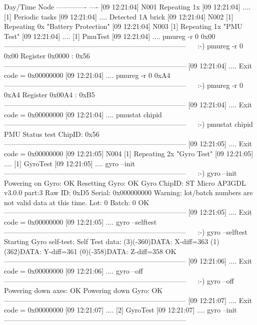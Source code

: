 \documentclass[11pt]{article}
\renewcommand{\mp}[1]{%
		\makebox[0in][r]{%
			\color{SmokeyDarkBlue}%
			\raisebox{0in}[0in][0in]{%
				\fbox{%
					\normalfont\bfseries\scriptsize##1%
					}%
				}%
			\rule[0.5ex]{2em}{\fboxrule}%
			\hspace{3pt}%
			}%
		}%
\begin{document}
\begin{AnnotedLogFile}
Day/Time      Node
------------- ----
[09 12:21:04] N001 Repeating 1x
[09 12:21:04] .... 	[1] Periodic tasks
[09 12:21:04] .... 		Detected 1A brick
[09 12:21:04] N002 	[1] Repeating 0x "Battery Protection"
[09 12:21:04] N003 	[1] Repeating 1x "PMU Test"
[09 12:21:04] .... 		[1] PmuTest
[09 12:21:04] .... 			pmureg -r 0 0x00
------------------------------------------------------------------------------
~\mp{Diags Command}~:-) pmureg -r 0 0x00
Register 0x0000 : 0x56
------------------------------------------------------------------------------
[09 12:21:04] .... 			Exit code = 0x00000000
[09 12:21:04] .... 			pmureg -r 0 0xA4
------------------------------------------------------------------------------
~\mp{Diags Command}~:-) pmureg -r 0 0xA4
Register 0x00A4 : 0xB5
------------------------------------------------------------------------------
[09 12:21:04] .... 			Exit code = 0x00000000
[09 12:21:04] .... 			pmustat chipid
------------------------------------------------------------------------------
~\mp{Diags Command}~:-) pmustat chipid
PMU Status test
ChipID: 0x56
------------------------------------------------------------------------------
[09 12:21:05] .... 			Exit code = 0x00000000
[09 12:21:05] N004 	[1] Repeating 2x "Gyro Test"
[09 12:21:05] .... 		[1] GyroTest
[09 12:21:05] .... 			gyro --init
------------------------------------------------------------------------------
~\mp{Diags Command}~:-) gyro --init
Powering on Gyro: OK
Resetting Gyro: OK
Gyro ChipID: ST Micro AP3GDL v3.0.0 part:3
Raw ID: 0xD5
Serial: 0x000000000
Warning: lot/batch numbers are not valid data at this time.
Lot: 0 Batch: 0
OK
------------------------------------------------------------------------------
[09 12:21:05] .... 			Exit code = 0x00000000
[09 12:21:05] .... 			gyro --selftest
------------------------------------------------------------------------------
~\mp{Diags Command}~:-) gyro --selftest
Starting Gyro self-test:
Self Test data:
(3)(-360)DATA: X-diff=363
(1)(362)DATA: Y-diff=361
(0)(-358)DATA: Z-diff=358
OK
------------------------------------------------------------------------------
[09 12:21:06] .... 			Exit code = 0x00000000
[09 12:21:06] .... 			gyro --off
------------------------------------------------------------------------------
~\mp{Diags Command}~:-) gyro --off
Powering down axes: OK
Powering down Gyro: OK
------------------------------------------------------------------------------
[09 12:21:07] .... 			Exit code = 0x00000000
[09 12:21:07] .... 		[2] GyroTest
[09 12:21:07] .... 			gyro --init
------------------------------------------------------------------------------

\end{AnnotedLogFile}
\end{document}
